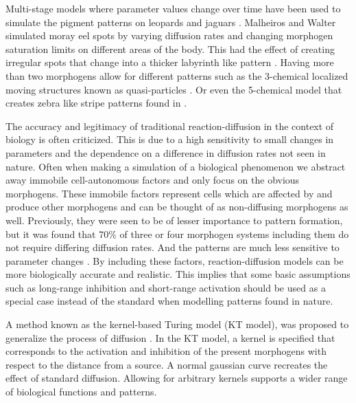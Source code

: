 Multi-stage models where parameter values change over time have been used to simulate the pigment patterns on leopards and jaguars \cite{liu2006two}. Malheiros and Walter simulated moray eel spots by varying diffusion rates and changing morphogen saturation limits on different areas of the body. This had the effect of creating irregular spots that change into a thicker labyrinth like pattern \cite{malheiros2017}. Having more than two morphogens allow for different patterns such as the 3-chemical localized moving structures known as quasi-particles \cite{schenk2000quasi}. Or even the 5-chemical model that creates zebra like stripe patterns found in \cite{Meinhardt1982}.

The accuracy and legitimacy of traditional reaction-diffusion in the context of biology is often criticized. This is due to a high sensitivity to small changes in parameters and the dependence on a difference in diffusion rates not seen in nature. Often when making a simulation of a biological phenomenon we abstract away immobile cell-autonomous factors and only focus on the obvious morphogens. These immobile factors represent cells which are affected by and produce other morphogens and can be thought of as non-diffusing morphogens as well. Previously, they were seen to be of lesser importance to pattern formation, but it was found that 70\% of three or four morphogen systems including them do not require differing diffusion rates. And the patterns are much less sensitive to parameter changes \cite{Marcon2016}. By including these factors, reaction-diffusion models can be more biologically accurate and realistic. This implies that some basic assumptions such as long-range inhibition and short-range activation should be used as a special case instead of the
standard when modelling patterns found in nature.

A method known as the kernel-based Turing model (KT model), was proposed to generalize the process of diffusion \cite{KONDO2017120}. In the KT model, a kernel is specified that corresponds to the activation and inhibition of the present morphogens with respect to the distance from a source. A normal gaussian curve recreates the effect of standard diffusion. Allowing for arbitrary kernels supports a wider range of biological functions and patterns.